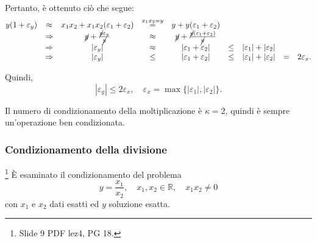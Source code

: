 
Pertanto, è ottenuto ciò che segue:
\begin{equation*}
	\begin{matrix}
		y(1+\varepsilon_y) &\approx& x_1x_2+x_1x_2(\varepsilon_1+\varepsilon_2) &\overset{x_1x_2=y}{=}& y+y(\varepsilon_1+\varepsilon_2)\\
		&\Rightarrow&\cancel{y}+\frac{\cancel{y}\varepsilon_y}{\cancel{y}}&\approx&\cancel{y}+\frac{\cancel{y}(\varepsilon_1+\varepsilon_2)}{\cancel{y}}\\
		&\Rightarrow& |\varepsilon_y| &\approx& |\varepsilon_1+\varepsilon_2| &\leq& |\varepsilon_1|+|\varepsilon_2|\\
		&\Rightarrow& |\varepsilon_y| &\leq& |\varepsilon_1 + \varepsilon_2| &\leq& |\varepsilon_1|+|\varepsilon_2| &=& 2\varepsilon_x.
	\end{matrix}
\end{equation*}

Quindi,
\begin{equation*}
	|\varepsilon_y|\leq 2\varepsilon_x,\quad \varepsilon_x=\max\{|\varepsilon_1|,|\varepsilon_2|\}.
\end{equation*}

\begin{definition}
	Il numero di condizionamento della moltiplicazione è $\kappa=2$, quindi è sempre un'operazione ben condizionata.
\end{definition}

\subsubsection{Condizionamento della divisione}
\footnote{Slide 9 PDF lez4, PG 18.} È esaminato il condizionamento del problema
\begin{equation}\label{eq:problema_condizionamento_divisione}
	y=\frac{x_1}{x_2},\quad x_1,x_2\in\mathbb R,\quad x_1x_2\neq 0
\end{equation}
con $x_1$ e $x_2$ dati esatti ed $y$ soluzione esatta.

